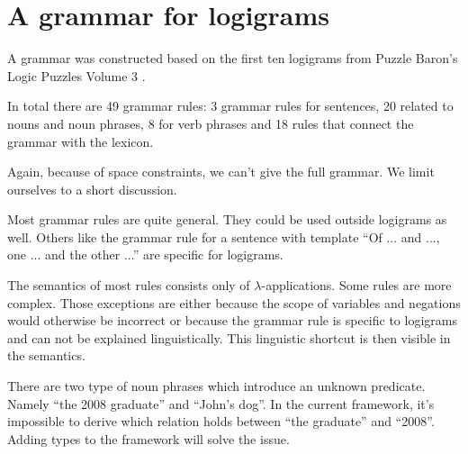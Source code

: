 \section{A grammar for logigrams}
A grammar was constructed based on the first ten logigrams from Puzzle Baron's Logic Puzzles Volume 3 \cite{logigrammen}.

In total there are 49 grammar rules: 3 grammar rules for sentences, 20 related to nouns and noun phrases, 8 for verb phrases and 18 rules that connect the grammar with the lexicon.

Again, because of space constraints, we can't give the full grammar. We limit ourselves to a short discussion.

Most grammar rules are quite general. They could be used outside logigrams as well. Others like the grammar rule for a sentence with template ``Of ... and ..., one ... and the other ...'' are specific for logigrams.

The semantics of most rules consists only of $\lambda$-applications. Some rules are more complex. Those exceptions are either because the scope of variables and negations would otherwise be incorrect or because the grammar rule is specific to logigrams and can not be explained linguistically. This linguistic shortcut is then visible in the semantics.

There are two type of noun phrases which introduce an unknown predicate. Namely ``the 2008 graduate'' and ``John's dog''. In the current framework, it's impossible to derive which relation holds between ``the graduate'' and ``2008''. Adding types to the framework will solve the issue.
